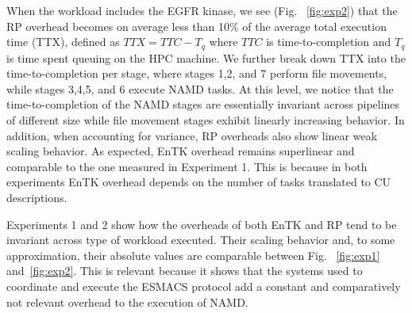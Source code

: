 \documentclass{bmcart}
\def\texttt{[image: ]}
\begin{document}


When the workload includes the EGFR kinase, we see (Fig. ~\ref{fig:exp2})
that the RP overhead becomes on average less than 10\% of the average total
execution time (TTX), defined as \(TTX = TTC - T_q\) where \(TTC\) is
time-to-completion and \(T_q\) is time spent queuing on the HPC machine. We
further break down TTX into the time-to-completion per stage, where stages
1,2, and 7 perform file movements, while stages 3,4,5, and 6 execute NAMD
tasks. At this level, we notice that the time-to-completion of the NAMD
stages are essentially invariant across pipelines of different size while
file movement stages exhibit linearly increasing behavior. In addition, when
accounting for variance, RP overheads also show linear weak scaling behavior.
As expected, EnTK overhead remains superlinear and comparable to the one
measured in Experiment 1. This is because in both experiments EnTK overhead
depends on the number of tasks translated to CU descriptions.


Experiments 1 and 2 show how the overheads of both EnTK and RP tend to be
invariant across type of workload executed. Their scaling behavior and, to
some approximation, their absolute values are comparable between
Fig. ~\ref{fig:exp1} and~\ref{fig:exp2}. This is relevant because it shows
that the systems used to coordinate and execute the ESMACS protocol add a
constant and comparatively not relevant overhead to the execution of NAMD\@.



\end{document}
